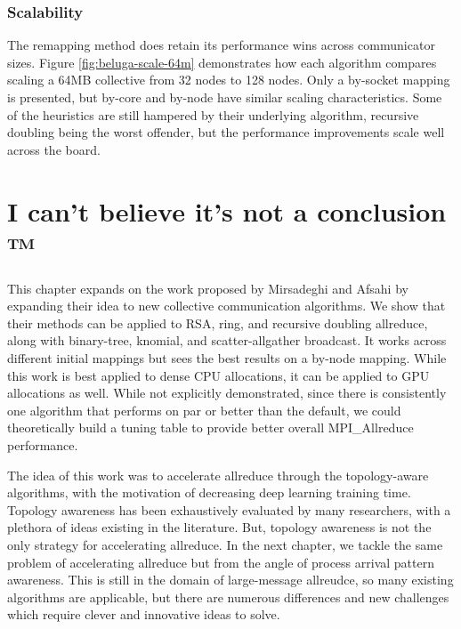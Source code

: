 \subsubsection{Scalability}



The remapping method does retain its performance wins across communicator sizes. 
Figure \ref{fig:beluga-scale-64m} demonstrates how each algorithm compares scaling a 64MB collective from 32 nodes to 128 nodes.
Only a by-socket mapping is presented, but by-core and by-node have similar scaling characteristics.
Some of the heuristics are still hampered by their underlying algorithm, recursive doubling being the worst offender, but the performance improvements scale well across the board.

\section{I can't believe it's not a conclusion ™}
This chapter expands on the work proposed by Mirsadeghi and Afsahi \cite{Mirsadeghi2016TopoAwareCollRR} by expanding their idea to new collective communication algorithms.
We show that their methods can be applied to RSA, ring, and recursive doubling allreduce, along with binary-tree, knomial, and scatter-allgather broadcast.
It works across different initial mappings but sees the best results on a by-node mapping.
While this work is best applied to dense CPU allocations, it can be applied to GPU allocations as well. 
While not explicitly demonstrated, since there is consistently one algorithm that performs on par or better than the default, we could theoretically build a tuning table to provide better overall MPI\_Allreduce performance. 

The idea of this work was to accelerate allreduce through the topology-aware algorithms, with the motivation of decreasing deep learning training time.
Topology awareness has been exhaustively evaluated by many researchers, with a plethora of ideas existing in the literature.
But, topology awareness is not the only strategy for accelerating allreduce.
In the next chapter, we tackle the same problem of accelerating allreduce but from the angle of process arrival pattern awareness.
This is still in the domain of large-message allreudce, so many existing algorithms are applicable, but there are numerous differences and new challenges which require clever and innovative ideas to solve.
